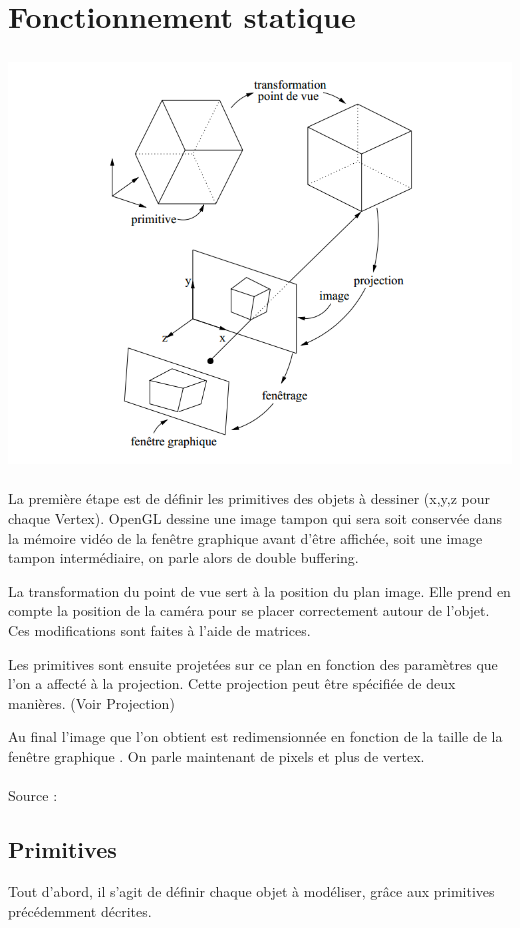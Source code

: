 \section{Fonctionnement statique}
\begin{center}
	 \includegraphics[height=11cm]{img/Fonctionnement}
 \end{center}

La première étape est de définir les primitives des objets à dessiner (x,y,z pour chaque Vertex).
OpenGL dessine une image tampon qui sera soit conservée dans la mémoire vidéo de la fenêtre graphique avant d’être affichée, soit une image tampon intermédiaire, on parle alors de double buffering.

La transformation du point de vue sert à la position du plan image. Elle prend en compte la position de la caméra pour se placer correctement autour de l'objet. Ces modifications sont faites à l'aide de matrices. 

Les primitives sont ensuite projetées sur ce plan en fonction des paramètres que l’on a affecté à la projection. Cette projection peut être spécifiée de deux manières. (Voir Projection)

Au final l’image que l’on obtient est redimensionnée en fonction de la taille de la fenêtre graphique . On parle maintenant de pixels et plus de vertex.
\\\\
Source : \cite{OpenGL}
\newpage

\subsection{Primitives}
Tout d'abord, il s'agit de définir chaque objet à modéliser, grâce aux primitives précédemment décrites.

